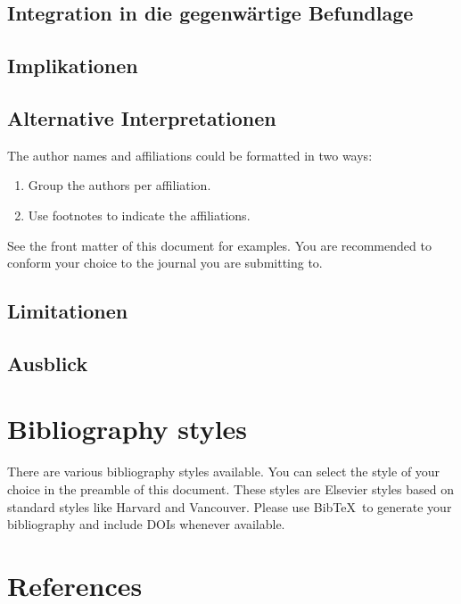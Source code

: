 \documentclass[preprint,12pt]{elsarticle}
\begin{document}
\subsection{Integration in die gegenwärtige Befundlage}

\subsection{Implikationen}

\subsection{Alternative Interpretationen}

The author names and affiliations could be formatted in two ways:
\begin{enumerate}[(1)]
\item Group the authors per affiliation.
\item Use footnotes to indicate the affiliations.
\end{enumerate}
See the front matter of this document for examples. You are recommended to conform your choice to the journal you are submitting to.

\subsection{Limitationen}

\subsection{Ausblick}


\section{Bibliography styles}

There are various bibliography styles available. You can select the style of your choice in the preamble of this document. These styles are Elsevier styles based on standard styles like Harvard and Vancouver. Please use Bib\TeX\ to generate your bibliography and include DOIs whenever available.

\section*{References}


\end{document}
